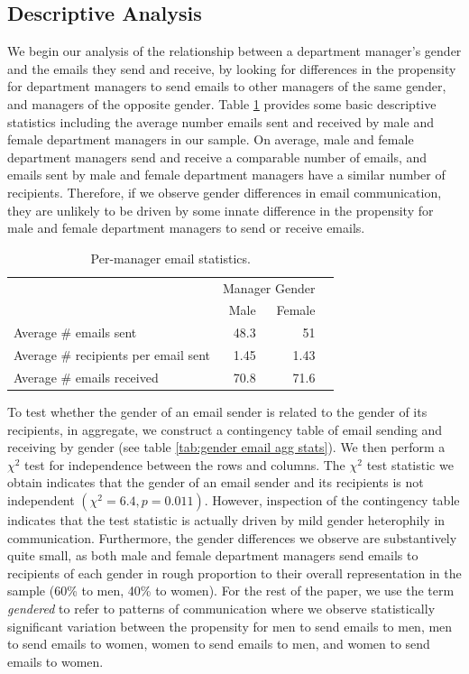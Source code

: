 \documentclass{pnastwo}
\begin{document}
\begin{article}
\section{Descriptive Analysis}

We begin our analysis of the relationship between a department manager's gender and the emails they send and receive, by looking for differences in the propensity for department managers to send emails to other managers of the same gender, and managers of the opposite gender. Table \ref{tab:email agg stats} provides some basic descriptive statistics including the average number emails sent and received by male and female department managers in our sample. On average, male and female department managers send and receive a comparable number of emails, and emails sent by male and female department managers have a similar number of recipients. Therefore, if we observe gender differences in email communication, they are unlikely to be driven by some innate difference in the propensity for male and female department managers to send or receive emails. 
	
\begin{table}
  \centering
  \begin{tabular}{m{2.1in}rrr}
    \toprule
    & \multicolumn{2}{c}{Manager Gender} \\
    \cmidrule{2-3}
    & Male & Female  \\
    \midrule
    Average \# emails sent & 48.3 & 51 \\
    Average \# recipients per email sent & 1.45 & 1.43 \\
    \midrule
    Average \# emails received & 70.8 & 71.6 \\
    \bottomrule
  \end{tabular}
  \caption{\label{tab:email agg stats} Per-manager email
    statistics.}
\end{table}

To test whether the gender of an email sender is related to the gender of its recipients, in aggregate, we construct a contingency table of email sending and receiving by gender (see table \ref{tab:gender email agg stats}). We then perform a $\chi^2$ test for independence between the rows and columns. The $\chi^2$ test statistic we obtain indicates that the gender of an email sender and its recipients is not independent $(\chi^2 = 6.4, p = 0.011)$. However, inspection of the contingency table indicates that the test statistic is actually driven by mild gender heterophily in communication. Furthermore, the gender differences we observe are substantively quite small, as both male and female department managers send emails to recipients of each gender in rough proportion to their overall representation in the sample (60\% to men, 40\% to women). For the rest of the paper, we use the term \emph{gendered} to refer to patterns of communication where we observe statistically significant variation between the propensity for men to send emails to men, men to send emails to women, women to send emails to men, and women to send emails to women.   
	

\end{article}
\end{document}
